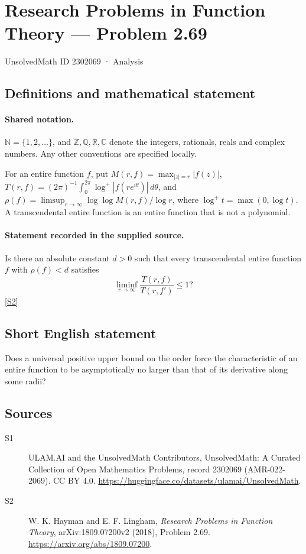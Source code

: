 \documentclass[11pt]{article}
\newcommand{\sref}[2]{\hyperlink{source:#1:#2}{[S#2]}}
\begin{document}
\setcounter{section}{2302068}
\section{Research Problems in Function Theory — Problem 2.69}\label{2302069}
{\small\sffamily UnsolvedMath ID 2302069 · Analysis}
\subsection{Definitions and mathematical statement}

\paragraph{Shared notation.}$\mathbb N=\{1,2,\ldots\}$, and $\mathbb Z,\mathbb Q,\mathbb R,\mathbb C$ denote the integers, rationals, reals and complex numbers. Any other conventions are specified locally.


For an entire function $f$, put $M(r,f)=\max_{|z|=r}|f(z)|$, $T(r,f)=(2\pi)^{-1}\int_0^{2\pi}\log^+|f(re^{i\theta})|\,d\theta$, and $\rho(f)=\limsup_{r\to\infty}\log\log M(r,f)/\log r$, where $\log^+t=\max(0,\log t)$. A transcendental entire function is an entire function that is not a polynomial.
\paragraph{Statement recorded in the supplied source.}
Is there an absolute constant $d>0$ such that every transcendental entire function $f$ with $\rho(f)<d$ satisfies
\[\liminf_{r\to\infty}\frac{T(r,f)}{T(r,f')}\leq1?\] \sref{2302069}{2}
\subsection{Short English statement}
Does a universal positive upper bound on the order force the characteristic of an entire function to be asymptotically no larger than that of its derivative along some radii?
\subsection{Sources}
\begin{description}
\item[\hypertarget{source:2302069:1}{S1}] ULAM.AI and the UnsolvedMath Contributors, UnsolvedMath: A Curated Collection of Open Mathematics Problems, record 2302069 (AMR-022-2069). CC BY 4.0. \url{https://huggingface.co/datasets/ulamai/UnsolvedMath}.
\item[\hypertarget{source:2302069:2}{S2}] W. K. Hayman and E. F. Lingham, \emph{Research Problems in Function Theory}, arXiv:1809.07200v2 (2018), Problem 2.69. \url{https://arxiv.org/abs/1809.07200}.
\end{description}
\label{end:2302069}
\end{document}
